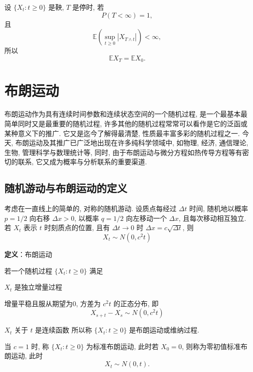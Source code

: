 \documentclass[openany]{ctexbook}
\theoremstyle{kaiti}
\theoremstyle{normal}
\begin{document}
设 $\{X_t:t\geqslant0\}$ 是鞅, $T$ 是停时, 若
\begin{equation}
  P(T<\infty)=1,
\end{equation}
 且 
\begin{equation}
  \mathbb{E}\left(\sup_{t\geqslant0}|X_{T\wedge t}|\right)<\infty,
\end{equation} 
所以 
\begin{equation}
  \mathbb{E}X_T=\mathbb{E}X_0.
\end{equation}

\chapter{布朗运动}

布朗运动作为具有连续时间参数和连续状态空间的一个随机过程, 是一个最基本最简单同时又是最重要的随机过程, 许多其他的随机过程常常可以看作是它的泛函或某种意义下的推广. 它又是迄今了解得最清楚, 性质最丰富多彩的随机过程之一. 今天, 布朗运动及其推广已广泛地出现在许多纯科学领域中, 如物理, 经济, 通信理论, 生物, 管理科学与数理统计等, 同时, 由于布朗运动与微分方程如热传导方程等有密切的联系, 它又成为概率与分析联系的重要渠道.

\section{随机游动与布朗运动的定义}

考虑在一直线上的简单的, 对称的随机游动. 设质点每经过 $\Delta t$ 时间, 随机地以概率 $p=1/2$ 向右移 $\Delta x>0$, 以概率 $q=1/2$ 向左移动一个 $\Delta x$, 且每次移动相互独立. 若 $X_t$ 表示 $t$ 时刻质点的位置, 且有 $\Delta t\to0$ 时 $\Delta x=c\sqrt{\Delta t}$, 则
\begin{equation}
  X_t\sim N(0,c^2t)
\end{equation}

\textbf{定义}：布朗运动

若一个随机过程 $\{X_t:t\geqslant0\}$ 满足

$X_t$ 是独立增量过程

增量平稳且服从期望为0, 方差为 $c^2t$ 的正态分布, 即
\begin{equation}
  X_{s+t}-X_s\sim N(0,c^2t)
\end{equation}


$X_t$ 关于 $t$ 是连续函数
所以称 $\{X_t:t\geqslant0\}$ 是布朗运动或维纳过程.

当 $c=1$ 时, 称 $\{X_t:t\geqslant0\}$ 为标准布朗运动, 此时若 $X_0=0$, 则称为零初值标准布朗运动, 此时
\begin{equation}
  X_t\sim N(0,t).
\end{equation}
\end{document}
